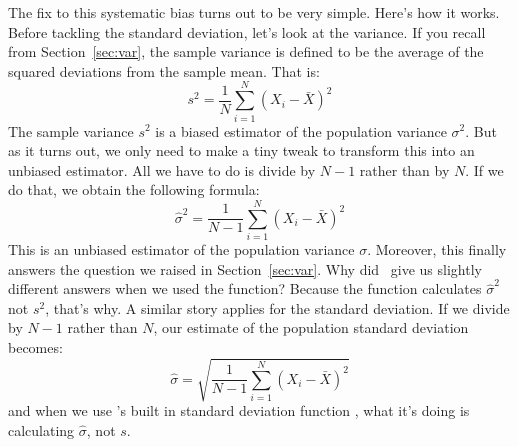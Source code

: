 The fix to this systematic bias turns out to be very simple. Here's how it works. Before tackling the standard deviation, let's look at the variance. If you recall from Section~\ref{sec:var}, the sample variance is defined to be the average of the squared deviations from the sample mean. That is:
$$
s^2 = \frac{1}{N} \sum_{i=1}^N (X_i - \bar{X})^2
$$
The sample variance $s^2$ is a biased estimator of the population variance $\sigma^2$. But as it turns out, we only need to make a tiny tweak to transform this into an unbiased estimator. All we have to do is divide by $N-1$ rather than by $N$. If we do that, we obtain the following formula:
$$
\hat\sigma^2 = \frac{1}{N-1} \sum_{i=1}^N (X_i - \bar{X})^2 
$$
This is an unbiased estimator of the population variance $\sigma$. Moreover, this finally answers the question we raised in Section~\ref{sec:var}. Why did \R\ give us slightly different answers when we used the  function? Because the  function calculates $\hat\sigma^2$ not $s^2$, that's why. A similar story applies for the standard deviation. If we divide by $N-1$ rather than $N$, our estimate of the population standard deviation becomes:
$$
\hat\sigma = \sqrt{\frac{1}{N-1} \sum_{i=1}^N (X_i - \bar{X})^2} 
$$
and when we use \R's built in standard deviation function , what it's doing is calculating $\hat\sigma$, not $s$. 

